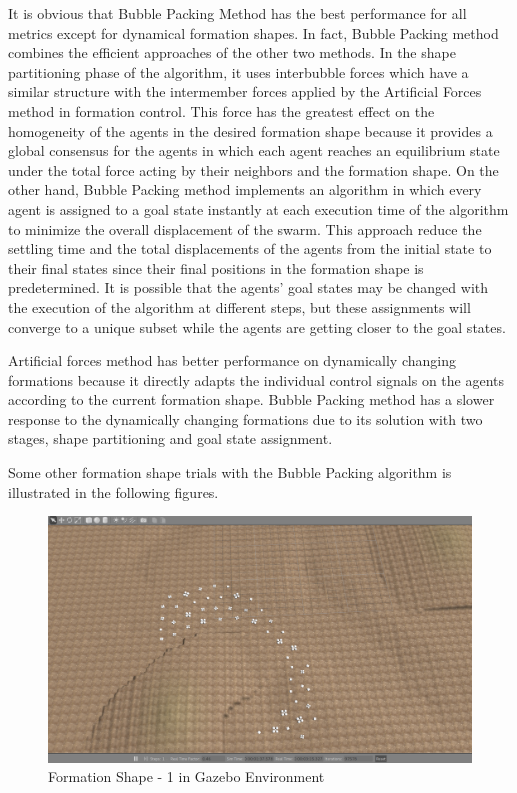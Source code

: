 It is obvious that Bubble Packing Method has the best performance for all metrics except for dynamical formation shapes. In fact, Bubble Packing method combines the efficient approaches of the other two methods. In the shape partitioning phase of the algorithm, it uses interbubble forces which have a similar structure with the intermember forces applied by the Artificial Forces method in formation control. This force has the greatest  effect on the homogeneity of the agents in the desired formation shape because it provides a global consensus for the agents in which each agent reaches an equilibrium state under the total force acting by their neighbors and the formation shape. On the other hand, Bubble Packing method implements an algorithm in which every agent is assigned to a goal state instantly at each execution time of the algorithm to minimize the overall displacement of the swarm. This approach reduce the settling time and the total displacements of the agents from the initial state to their final states since their final positions in the formation shape is predetermined. It is possible that the agents' goal states may be changed with the execution of the algorithm at different steps, but these assignments will converge to a unique subset while the agents are getting closer to the goal states. 

Artificial forces method has better performance on dynamically changing formations because it directly adapts the individual control signals on the agents according to the current formation shape. Bubble Packing method has a slower response to the dynamically changing formations due to its solution with two stages, shape partitioning and goal state assignment. 
		
Some other formation shape trials with the Bubble Packing algorithm is illustrated in the following figures.

\begin{figure}[H]
\caption{Formation Shape - 1 in Gazebo Environment}
\centerline{\includegraphics[scale = 0.32]{1_Gazebo}}
\end{figure} 
			
